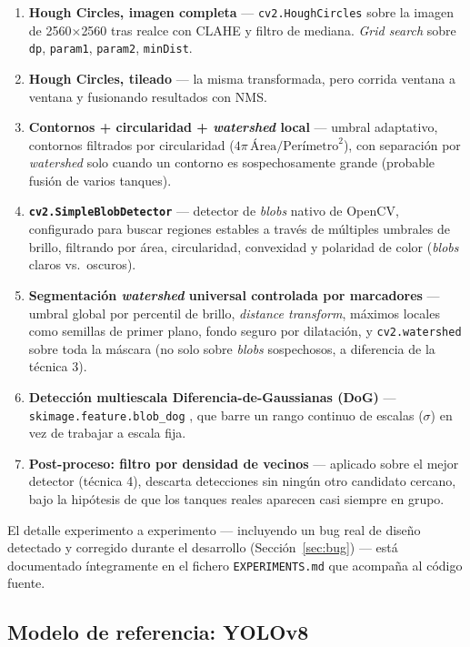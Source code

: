 \documentclass[11pt,a4paper]{article}
\begin{document}
\begin{enumerate}
    \item \textbf{Hough Circles, imagen completa} --- \texttt{cv2.HoughCircles} sobre
    la imagen de 2560$\times$2560 tras realce con CLAHE y filtro de mediana.
    \emph{Grid search} sobre \texttt{dp}, \texttt{param1}, \texttt{param2},
    \texttt{minDist}.
    \item \textbf{Hough Circles, tileado} --- la misma transformada, pero corrida
    ventana a ventana y fusionando resultados con NMS.
    \item \textbf{Contornos + circularidad + \emph{watershed} local} --- umbral
    adaptativo, contornos filtrados por circularidad
    ($4\pi\,\text{Área}/\text{Perímetro}^2$), con separación por \emph{watershed}
    solo cuando un contorno es sospechosamente grande (probable fusión de varios
    tanques).
    \item \textbf{\texttt{cv2.SimpleBlobDetector}} --- detector de \emph{blobs}
    nativo de OpenCV, configurado para buscar regiones estables a través de
    múltiples umbrales de brillo, filtrando por área, circularidad, convexidad y
    polaridad de color (\emph{blobs} claros vs.\ oscuros).
    \item \textbf{Segmentación \emph{watershed} universal controlada por
    marcadores} --- umbral global por percentil de brillo, \emph{distance
    transform}, máximos locales como semillas de primer plano, fondo seguro por
    dilatación, y \texttt{cv2.watershed} sobre toda la máscara (no solo sobre
    \emph{blobs} sospechosos, a diferencia de la técnica 3).
    \item \textbf{Detección multiescala Diferencia-de-Gaussianas (DoG)} ---
    \texttt{skimage.feature.blob\_dog} \cite{lindeberg1998scale}, que barre un rango
    continuo de escalas ($\sigma$) en vez de trabajar a escala fija.
    \item \textbf{Post-proceso: filtro por densidad de vecinos} --- aplicado sobre
    el mejor detector (técnica 4), descarta detecciones sin ningún otro candidato
    cercano, bajo la hipótesis de que los tanques reales aparecen casi siempre en
    grupo.
\end{enumerate}

El detalle experimento a experimento --- incluyendo un bug real de diseño detectado
y corregido durante el desarrollo (Sección~\ref{sec:bug}) --- está documentado
íntegramente en el fichero \texttt{EXPERIMENTS.md} que acompaña al código fuente.

\subsection{Modelo de referencia: YOLOv8}
\end{document}

